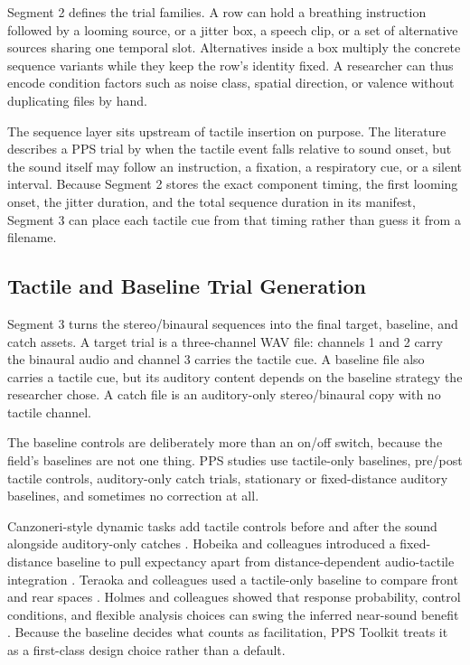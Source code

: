 \documentclass[pdflatex,sn-apa]{sn-jnl}
\newcommand{\toolkit}{PPS Toolkit}
\begin{document}
Segment 2 defines the trial families. A row can hold a breathing instruction followed by a looming source, or a jitter box, a speech clip, or a set of alternative sources sharing one temporal slot. Alternatives inside a box multiply the concrete sequence variants while they keep the row's identity fixed. A researcher can thus encode condition factors such as noise class, spatial direction, or valence without duplicating files by hand.

The sequence layer sits upstream of tactile insertion on purpose. The literature describes a PPS trial by when the tactile event falls relative to sound onset, but the sound itself may follow an instruction, a fixation, a respiratory cue, or a silent interval. Because Segment 2 stores the exact component timing, the first looming onset, the jitter duration, and the total sequence duration in its manifest, Segment 3 can place each tactile cue from that timing rather than guess it from a filename.

\subsection{Tactile and Baseline Trial Generation}

Segment 3 turns the stereo/binaural sequences into the final target, baseline, and catch assets. A target trial is a three-channel WAV file: channels 1 and 2 carry the binaural audio and channel 3 carries the tactile cue. A baseline file also carries a tactile cue, but its auditory content depends on the baseline strategy the researcher chose. A catch file is an auditory-only stereo/binaural copy with no tactile channel.

The baseline controls are deliberately more than an on/off switch, because the field's baselines are not one thing. PPS studies use tactile-only baselines, pre/post tactile controls, auditory-only catch trials, stationary or fixed-distance auditory baselines, and sometimes no correction at all.

Canzoneri-style dynamic tasks add tactile controls before and after the sound alongside auditory-only catches \citep{Canzoneri2012}. Hobeika and colleagues introduced a fixed-distance baseline to pull expectancy apart from distance-dependent audio-tactile integration \citep{Hobeika2019}. Teraoka and colleagues used a tactile-only baseline to compare front and rear spaces \citep{Teraoka2024}. Holmes and colleagues showed that response probability, control conditions, and flexible analysis choices can swing the inferred near-sound benefit \citep{Holmes2020}. Because the baseline decides what counts as facilitation, \toolkit{} treats it as a first-class design choice rather than a default.
\end{document}
